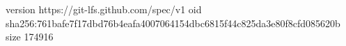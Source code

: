 version https://git-lfs.github.com/spec/v1
oid sha256:761bafe7f17dbd76b4eafa4007064154dbc6815f44c825da3e80f8cfd085620b
size 174916
